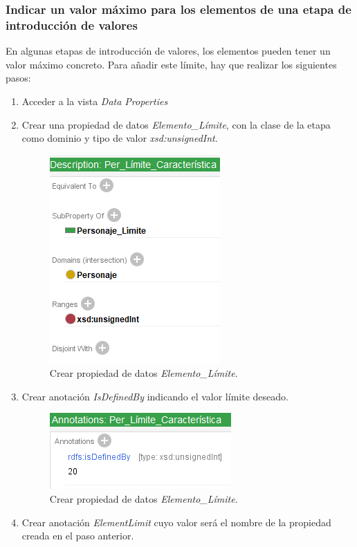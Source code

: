 \subsubsection{Indicar un valor máximo para los elementos de una etapa de introducción de valores}
En algunas etapas de introducción de valores, los elementos pueden tener un valor máximo concreto.
Para añadir este límite, hay que realizar los siguientes pasos:
\begin{enumerate}
    \item Acceder a la vista \textit{Data Properties}
    \item Crear una propiedad de datos \textit{Elemento\_Límite}, con la clase de la etapa como dominio 
    y tipo de valor \textit{xsd:unsignedInt}.
    \begin{figure}[H]
        \centering
        \includegraphics[scale=0.8]{Figures/Protege/ElementLimit_1.png}
        \caption{Crear propiedad de datos \textit{Elemento\_Límite}.}
        \label{ElementLimit_1}
    \end{figure}
    \item Crear anotación \textit{IsDefinedBy} indicando el valor límite deseado.
    \begin{figure}[H]
        \centering
        \includegraphics[scale=0.8]{Figures/Protege/ElementLimit_2.png}
        \caption{Crear propiedad de datos \textit{Elemento\_Límite}.}
        \label{ElementLimit_2}
    \end{figure}
    \item Crear anotación \textit{ElementLimit} cuyo valor será el nombre de la propiedad creada en el paso anterior.

\end{enumerate}
